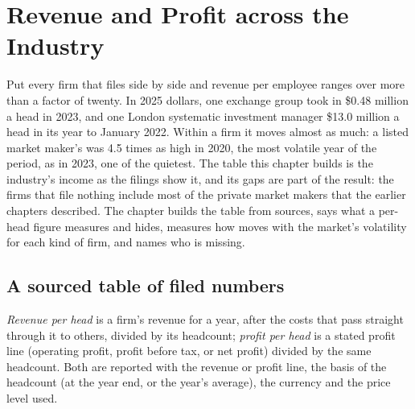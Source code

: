 \chapter{Revenue and Profit across the Industry}\label{ch:in:revenue-and-profit-across-the-industry}

Put every firm that files side by side and revenue per employee ranges over more than a factor of twenty. In 2025
dollars, one exchange group took in \$0.48 million a head in 2023, and one London systematic investment manager \$13.0
million a head in its year to January 2022. Within a firm it moves almost as much: a listed market maker's  was 4.5 times as high in 2020, the most volatile year of the period, as in 2023, one of the quietest. The table
this chapter builds is the industry's income as the filings show it, and its gaps are part of the result: the firms
that file nothing include most of the private market makers that the earlier chapters described. The chapter builds
the table from sources, says what a per-head figure measures and hides, measures how  moves with the
market's volatility for each kind of firm, and names who is missing.

\section{A sourced table of filed numbers}

\begin{definition}\label{def:in:revenue-and-profit-across-the-industry:perhead}
\emph{Revenue per head} is a firm's revenue for a year, after the costs that pass straight
through it to others, divided by its headcount; \emph{profit per head} is a stated profit line
(operating profit, profit before tax, or net profit) divided by the same headcount. Both are reported with the revenue
or profit line, the basis of the headcount (at the year end, or the year's average), the currency and the price level
used.
\end{definition}

